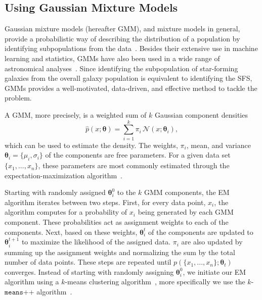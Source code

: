 \documentclass[tighten, preprint]{aastex62}
\begin{document}
\subsection{Using Gaussian Mixture Models} \label{sec:gmm}
Gaussian mixture models (hereafter GMM), and mixture models in general, provide 
a probabilistic way of describing the distribution of a population by 
identifying subpopulations from the data~\citep[][]{Press:1992:NRC:148286, 9780471006268}.
Besides their extensive use in machine learning and statistics, 
GMMs have also been used in a wide range of astronomical analyses~\citep[\emph{e.g.}][]{bovy2011,lee2012,taylor2015}. 
Since identifying the subpopulation of star-forming galaxies from the overall
galaxy population is equivalent to identifying the SFS, GMMs provides a 
well-motivated, data-driven, and effective method to tackle the problem. 

A GMM, more precisely, is a weighted sum of $k$ Gaussian component densities 
\begin{equation} \label{eq:gmm}
\hat{p}(x;\bm{\theta}) = \sum\limits_{i=1}^{k} \pi_i \, \mathcal{N}(x; \bm{\theta}_i),
\end{equation}
which can be used to estimate the density. The weights, $\pi_i$, mean, and 
variance $\bm{\theta}_i=\{\mu_i, \sigma_i\}$ of the components are free 
parameters. For a given data set $\{x_1, ..., x_n\}$, these 
parameters are most commonly estimated through the expectation-maximization 
algorithm~\citep[EM;][]{dempster1977,neal1998}. 

Starting with randomly assigned $\bm{\theta}_{i}^0$ to the $k$ GMM components, 
the EM algorithm iterates between two steps. First, for every data point, 
$x_i$, the algorithm computes for a probability of $x_i$ being generated by 
each GMM component. These probabilities act as assignment weights to each of
the components. Next, based on these weights, $\bm{\theta}_i^t$ of the components 
are updated to $\bm{\theta}_i^{t+1}$ to maximize the likelihood of the assigned 
data. $\pi_i$ are also updated by summing up the assignment weights and 
normalizing the sum by the total number of data points. These steps are 
repeated until $p(\{x_1, ..., x_n\} ; \bm{\theta}_t)$ converges. Instead of 
starting with randomly assigning $\bm{\theta}_{i}^0$, we initiate our EM algorithm 
using a $k$-means clustering algorithm~\citep{lloyd1982}, more specifically 
we use the $k$-$\mathtt{means}$++ algorithm~\citep{arthur2007}. 
\end{document}
